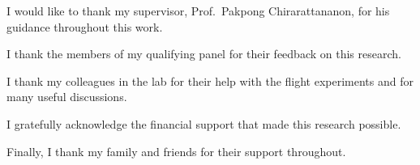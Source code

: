 
\begin{acknowledgements}

I would like to thank my supervisor, Prof.\ Pakpong Chirarattananon, for his
guidance throughout this work.

I thank the members of my qualifying panel for their feedback on this research.

I thank my colleagues in the lab for their help with the flight experiments
and for many useful discussions.

I gratefully acknowledge the financial support that made this research
possible.

Finally, I thank my family and friends for their support throughout.

\end{acknowledgements}
